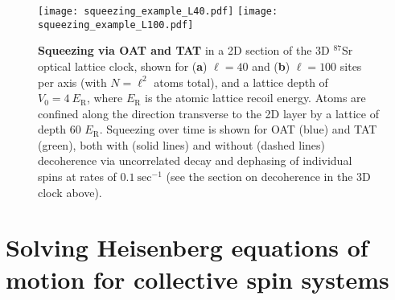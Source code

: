 \documentclass{nature}
\renewcommand{\t}{\text} %
\begin{document}
\begin{spacing}{1}
\begin{figure}
\centering
\texttt{[image: squeezing\_example\_L40.pdf]}
\texttt{[image: squeezing\_example\_L100.pdf]}
\caption{{\bf Squeezing via OAT and TAT} in a 2D section of the 3D $^{87}$Sr optical lattice clock, shown for ({\bf a}) $\ell=40$ and ({\bf b}) $\ell=100$ sites per axis (with $N=\ell^2$ atoms total), and a lattice depth of $V_0=4~E_{\t{R}}$, where $E_{\t{R}}$ is the atomic lattice recoil energy.
Atoms are confined along the direction transverse to the 2D layer by a lattice of depth 60 $E_{\t{R}}$.
Squeezing over time is shown for OAT (blue) and TAT (green), both with (solid lines) and without (dashed lines) decoherence via uncorrelated decay and dephasing of individual spins at rates of $0.1~\t{sec}^{-1}$ (see the section on decoherence in the 3D clock above).
}
\label{fig:squeezing_example}
\end{figure}
\end{spacing}



\section*{Solving Heisenberg equations of motion for collective spin systems}
\end{document}
